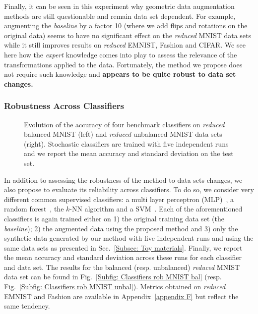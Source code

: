 \documentclass[10pt,journal,compsoc]{IEEEtran}
\begin{document}
Finally, it can be seen in this experiment why geometric data augmentation methods are still questionable and remain data set dependent. For example, augmenting the \textit{baseline} by a factor 10 (where we add flips and rotations on the original data) seems to have no significant effect on the \emph{reduced} MNIST data sets while it still improves results on \emph{reduced} EMNIST, Fashion and CIFAR. We see here how the \emph{expert} knowledge comes into play to assess the relevance of the transformations applied to the data. Fortunately, the method we propose does not require such knowledge and \textbf{appears to be quite robust to data set changes.}


\subsubsection{Robustness Across Classifiers}\label{Subsec: classifier robustness}

 \begin{figure*}[!ht] 
  \centering
  \hfil
  \centering
  
  \caption{Evolution of the accuracy of four benchmark classifiers on \emph{reduced} balanced MNIST (left) and \emph{reduced} unbalanced MNIST data sets (right). Stochastic classifiers are trained with five independent runs and we report the mean accuracy and standard deviation on the test set.}
  \label{Fig: Classifiers rob}
  \end{figure*}
  
In addition to assessing the robustness of the method to data sets changes, we also propose to evaluate its reliability across classifiers. To do so, we consider very different common supervised classifiers: a multi layer perceptron (MLP)~\cite{goodfellow_deep_2016}, a random forest~\cite{breiman_random_2001}, the $k$-NN algorithm and a SVM~\cite{kotsiantis_supervised_2007}. Each of the aforementioned classifiers is again trained either on 1) the original training data set (the \emph{baseline}); 2) the augmented data using the proposed method and 3) only the synthetic data generated by our method with five independent runs and using the same data sets as presented in Sec.~\ref{Subsec: Toy materials}. Finally, we report the mean accuracy and standard deviation across these runs for each classifier and data set. The results for the balanced (resp. unbalanced) \emph{reduced} MNIST data set can be found in Fig.~\ref{Subfig: Classifiers rob MNIST bal} (resp. Fig.~\ref{Subfig: Classifiers rob MNIST unbal}). Metrics obtained on \emph{reduced} EMNIST and Fashion are available in Appendix~\ref{appendix F} but reflect the same tendency. 
\end{document}
